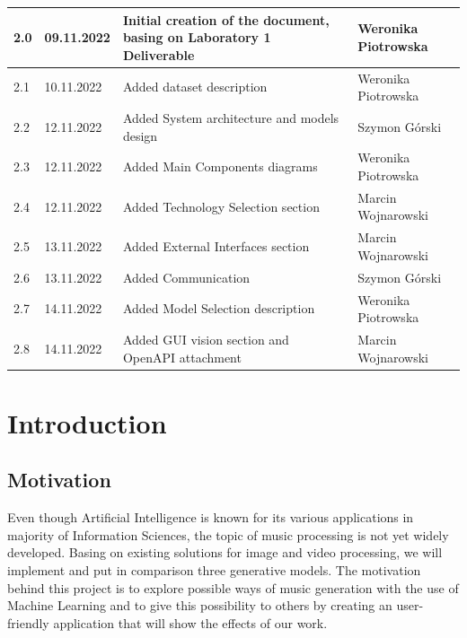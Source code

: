 \documentclass{article}
\newcommand{\currentversion}{2.8}
\begin{document}
\begin{center}
\begin{tabular}{ |p{} | p{} | p{} | p{}| }
        2.0             & 09.11.2022 & Initial creation of the document, basing on Laboratory 1 Deliverable & Weronika Piotrowska \\
        \hline

        2.1             & 10.11.2022 & Added dataset description                                            & Weronika Piotrowska \\
        \hline

        2.2             & 12.11.2022 & Added System architecture and models design                          & Szymon Górski       \\
        \hline

        2.3             & 12.11.2022 & Added Main Components diagrams                                       & Weronika Piotrowska \\
        \hline
        2.4             & 12.11.2022 & Added Technology Selection section                                   & Marcin Wojnarowski  \\
        \hline

        2.5             & 13.11.2022 & Added External Interfaces section                                    & Marcin Wojnarowski  \\
        \hline
        2.6             & 13.11.2022 & Added Communication                                                  & Szymon Górski       \\
        \hline

        2.7             & 14.11.2022 & Added Model Selection description                                    & Weronika Piotrowska \\
        \hline
        \currentversion & 14.11.2022 & Added GUI vision section and OpenAPI attachment                      & Marcin Wojnarowski  \\
        \hline
    \end{tabular}
\end{center}

\newpage


\tableofcontents
\newpage

\section{Introduction}
\subsection{Motivation}
Even though Artificial Intelligence is known for its various applications in majority of Information Sciences, the topic of music processing is not yet widely developed. Basing on existing solutions for image and video processing, we will implement and put in comparison three generative models. The motivation behind this project is to explore possible ways of music generation with the use of Machine Learning and to give this possibility to others by creating an user-friendly application that will show the effects of our work.
\end{document}
